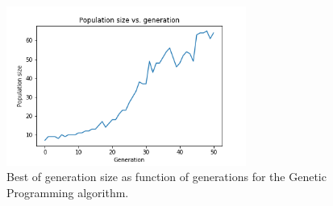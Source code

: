 \documentclass{article}
\begin{document}
 \begin{figure}[H]
    \centering
    \includegraphics[width=0.7\textwidth]{Assignment 1/Figures/A1_8a1.png}
    \caption{Best of generation size as function of generations for the Genetic Programming algorithm.}
    \label{fig:A1_8a1}
\end{figure}
    

 
 
 


\end{document}
